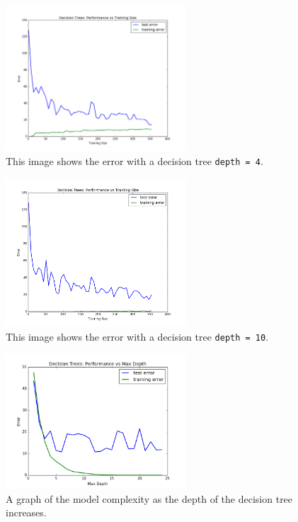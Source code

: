 \documentclass[12pt,letterpaper]{article}
\begin{document}
\begin{figure}[h!]
	\centering
	\includegraphics[width=0.6\textwidth]{dt-learningcurve-4.png}
	\caption{This image shows the error with a decision tree \texttt{depth = 4}.}
\end{figure}

\begin{figure}[h!]
	\centering
	\includegraphics[width=0.6\textwidth]{dt-learningcurve-10.png}
	\caption{This image shows the error with a decision tree \texttt{depth = 10}.}
\end{figure}

\begin{figure}[h!]
	\centering
	\includegraphics[width=0.6\textwidth]{model-complexity.png}
	\caption{A graph of the model complexity as the depth of the decision tree increases.}
\end{figure}
\end{document}
